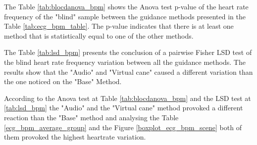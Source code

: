 The Table \ref{tab:blocdanova_bpm} shows the Anova test p-value of the heart rate frequency of the "blind" sample between the guidance methods presented in the Table \ref{tab:ecg_bpm_table}. The p-value indicates that there is at least one method that is statistically equal to one of the other methods.



The Table \ref{tab:lsd_bpm} presents the conclusion of a pairwise Fisher LSD test of the blind heart rate frequency variation between all the guidance methods. The results show that the "Audio" and "Virtual cane" caused a different variation than the one noticed on the "Base" Method.



According to the Anova test at Table \ref{tab:blocdanova_bpm} and the LSD test at \ref{tab:lsd_bpm} the "Audio" and the "Virtual cane" method provoked a different reaction than the "Base" method and analysing the Table \ref{ecg_bpm_average_group} and the Figure \ref{boxplot_ecg_bpm_scene} both of them provoked the highest heartrate variation.

\FloatBarrier